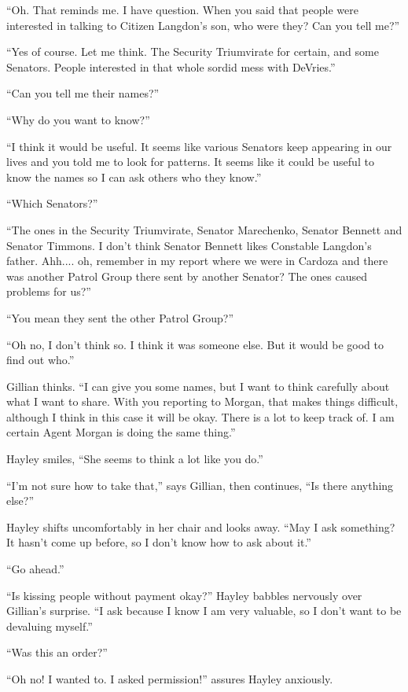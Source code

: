 ``Oh.  That reminds me.  I have question.  When you said that people were interested in talking to Citizen Langdon's son, who were they?  Can you tell me?''

``Yes of course.  Let me think.  The Security Triumvirate for certain, and some Senators.  People interested in that whole sordid mess with DeVries.''

``Can you tell me their names?''

``Why do you want to know?''

``I think it would be useful.  It seems like various Senators keep appearing in our lives and you told me to look for patterns.  It seems like it could be useful to know the names so I can ask others who they know.''

``Which Senators?''

``The ones in the Security Triumvirate, Senator Marechenko, Senator Bennett and Senator Timmons.  I don't think Senator Bennett likes Constable Langdon's father.  Ahh.... oh, remember in my report where we were in Cardoza and there was another Patrol Group there sent by another Senator?  The ones caused problems for us?''

``You mean they sent the other Patrol Group?''

``Oh no, I don't think so.  I think it was someone else.  But it would be good to find out who.''

Gillian thinks.  ``I can give you some names, but I want to think carefully about what I want to share.  With you reporting to Morgan, that makes things difficult, although I think in this case it will be okay.  There is a lot to keep track of.  I am certain Agent Morgan is doing the same thing.''

Hayley smiles, ``She seems to think a lot like you do.''

``I'm not sure how to take that,'' says Gillian, then continues, ``Is there anything else?''

Hayley shifts uncomfortably in her chair and looks away. ``May I ask something?  It hasn't come up before, so I don't know how to ask about it.''

``Go ahead.''

``Is kissing people without payment okay?''  Hayley babbles nervously over Gillian's surprise. ``I ask because I know I am very valuable, so I don't want to be devaluing myself.''

``Was this an order?'' 

``Oh no!  I wanted to.  I asked permission!'' assures Hayley anxiously.

